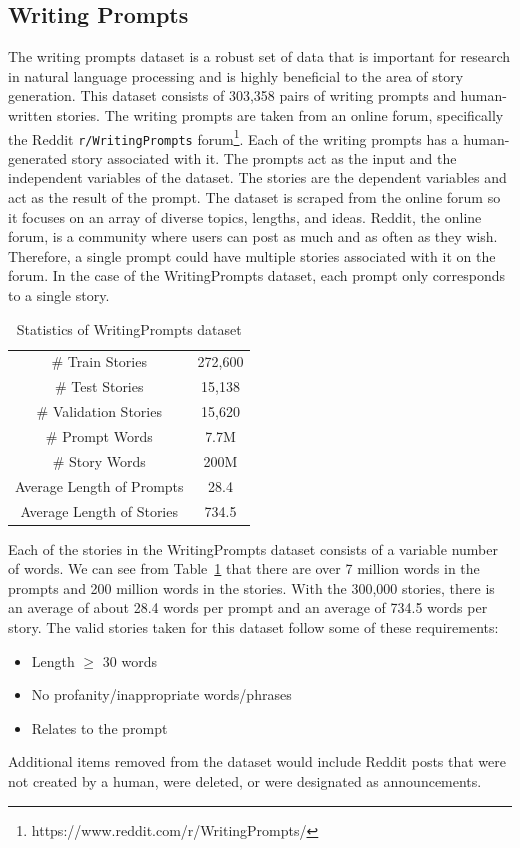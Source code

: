 \documentclass{article} %
\begin{document}
\subsection{Writing Prompts}

The writing prompts dataset is a robust set of data that is important for research in natural language processing and is highly beneficial to the area of story generation. This dataset consists of 303,358 pairs of writing prompts and human-written stories. The writing prompts are taken from an online forum, specifically the Reddit  \texttt{r/WritingPrompts} forum\footnote{https://www.reddit.com/r/WritingPrompts/}. Each of the writing prompts has a human-generated story associated with it. The prompts act as the input and the independent variables of the dataset. The stories are the dependent variables and act as the result of the prompt. The dataset is scraped from the online forum so it focuses on an array of diverse topics, lengths, and ideas. Reddit, the online forum, is a community where users can post as much and as often as they wish. Therefore, a single prompt could have multiple stories associated with it on the forum. In the case of the WritingPrompts dataset, each prompt only corresponds to a single story.

\begin{table}[htbp]
\centering
\caption{Statistics of WritingPrompts dataset}
\begin{tabular}{c c}
\hline
\# Train Stories & 272,600 \\
\# Test Stories & 15,138 \\
\# Validation Stories & 15,620 \\
\hline
\# Prompt Words & 7.7M \\
\# Story Words & 200M \\
\hline
Average Length of Prompts & 28.4 \\
Average Length of Stories & 734.5 \\
\hline
\end{tabular}
\label{table:stat}
\end{table}


Each of the stories in the WritingPrompts dataset consists of a variable number of words. We can see from Table~\ref{table:stat} that there are over 7 million words in the prompts and 200 million words in the stories. With the 300,000 stories, there is an average of about 28.4 words per prompt and an average of 734.5 words per story. The valid stories taken for this dataset follow some of these requirements:
\begin{itemize}
    \item Length $\geq$ 30 words
    \item No profanity/inappropriate words/phrases
    \item Relates to the prompt
\end{itemize}
Additional items removed from the dataset would include Reddit posts that were not created by a human, were deleted, or were designated as announcements.
\end{document}
